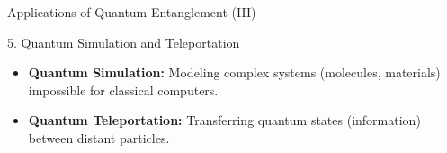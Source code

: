 \begin{frame}{Applications of Quantum Entanglement (III)}

  \begin{block}{5. Quantum Simulation and Teleportation}
    \begin{itemize}[<+->]
      \item \textbf{Quantum Simulation:} Modeling complex systems (molecules, materials) impossible for classical computers.
      \item \textbf{Quantum Teleportation:} Transferring quantum states (information) between distant particles.
    \end{itemize}
  \end{block}

\end{frame}
